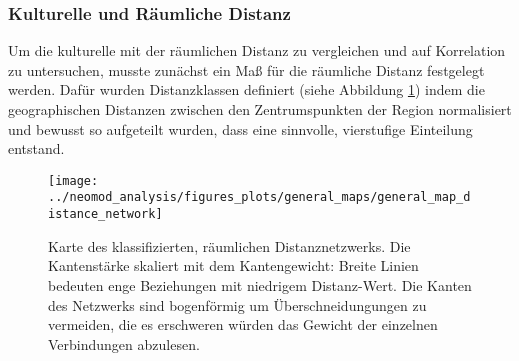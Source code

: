 \documentclass[openany,twoside,twocolumn]{book}
\begin{document}
\hypertarget{kulturelle-und-raumliche-distanz}{%
\subsubsection{Kulturelle und Räumliche Distanz}\label{kulturelle-und-raumliche-distanz}}

Um die kulturelle mit der räumlichen Distanz zu vergleichen und auf Korrelation zu untersuchen, musste zunächst ein Maß für die räumliche Distanz festgelegt werden. Dafür wurden Distanzklassen definiert (siehe Abbildung \ref{fig:map-regions-distance-classes}) indem die geographischen Distanzen zwischen den Zentrumspunkten der Region normalisiert und bewusst so aufgeteilt wurden, dass eine sinnvolle, vierstufige Einteilung entstand.

\begin{figure}
\texttt{[image: ../neomod\_analysis/figures\_plots/general\_maps/general\_map\_distance\_network]} \caption[Karte des klassifizierten, räumlichen Distanznetzwerks]{Karte des klassifizierten, räumlichen Distanznetzwerks. Die Kantenstärke skaliert mit dem Kantengewicht: Breite Linien bedeuten enge Beziehungen mit niedrigem Distanz-Wert. Die Kanten des Netzwerks sind bogenförmig um Überschneidungungen zu vermeiden, die es erschweren würden das Gewicht der einzelnen Verbindungen abzulesen.}\label{fig:map-regions-distance-classes}
\end{figure}
\end{document}
